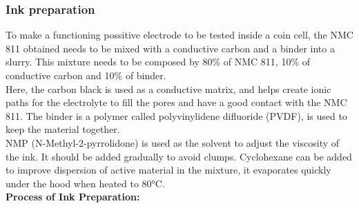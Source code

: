 \documentclass{article}
\begin{document}
\subsubsection{Ink preparation}
To make a functioning possitive electrode to be tested inside a coin cell, 
the NMC 811 obtained needs to be mixed with a conductive carbon and a binder into a slurry.
This mixture needs to be composed by 80\% of NMC 811, 10\% of conductive carbon and 10\% of binder.\\
Here, the carbon black is used as a conductive matrix, and helps create ionic paths for the electrolyte 
to fill the pores and have a good contact with the NMC 811\cite{Itou}. The binder is a polymer called polyvinylidene difluoride (PVDF),
is used to keep the material together.\\
NMP (N-Methyl-2-pyrrolidone) is used as the solvent to adjust the viscosity of the ink. It should be added gradually to avoid clumps. Cyclohexane can be added to improve dispersion of active material in the mixture, it evaporates quickly under the hood when heated to 80°C.\\
\textbf{Process of Ink Preparation:}\\
\end{document}

